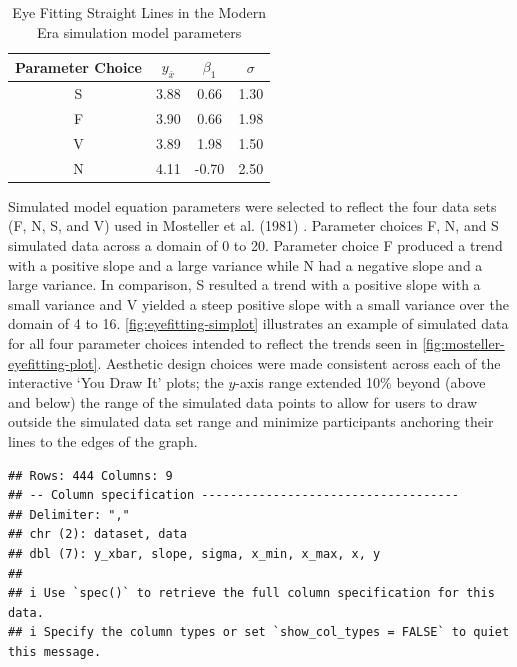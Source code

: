 \documentclass[print]{nuthesis}
\begin{document}
\begin{table}

\caption{\label{tab:eyefitting-parameters}Eye Fitting Straight Lines in the Modern Era simulation model parameters}
\centering
\begin{tabular}[t]{cccc}
\toprule
Parameter Choice & $y_{\bar{x}}$ & $\beta_1$ & $\sigma$\\
\midrule
S & 3.88 & 0.66 & 1.30\\
F & 3.90 & 0.66 & 1.98\\
V & 3.89 & 1.98 & 1.50\\
N & 4.11 & -0.70 & 2.50\\
\bottomrule
\end{tabular}
\end{table}

Simulated model equation parameters were selected to reflect the four data sets (F, N, S, and V) used in Mosteller et al. (1981) .
Parameter choices F, N, and S simulated data across a domain of 0 to 20.
Parameter choice F produced a trend with a positive slope and a large variance while N had a negative slope and a large variance.
In comparison, S resulted a trend with a positive slope with a small variance and V yielded a steep positive slope with a small variance over the domain of 4 to 16.
\cref{fig:eyefitting-simplot} illustrates an example of simulated data for all four parameter choices intended to reflect the trends seen in \cref{fig:mosteller-eyefitting-plot}.
Aesthetic design choices were made consistent across each of the interactive `You Draw It' plots; the \(y\)-axis range extended 10\% beyond (above and below) the range of the simulated data points to allow for users to draw outside the simulated data set range and minimize participants anchoring their lines to the edges of the graph.

\begin{verbatim}
## Rows: 444 Columns: 9
## -- Column specification ------------------------------------
## Delimiter: ","
## chr (2): dataset, data
## dbl (7): y_xbar, slope, sigma, x_min, x_max, x, y
## 
## i Use `spec()` to retrieve the full column specification for this data.
## i Specify the column types or set `show_col_types = FALSE` to quiet this message.
\end{verbatim}
\end{document}
